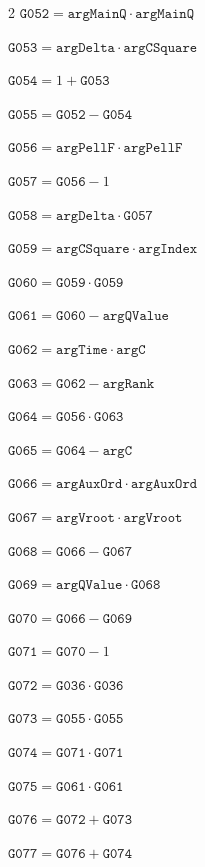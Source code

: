 \documentclass[10pt]{article}
\begin{document}
\begin{multicols}{2}
\noindent $\mathtt{G052}=\mathtt{argMainQ}\cdot \mathtt{argMainQ}$\par
\noindent $\mathtt{G053}=\mathtt{argDelta}\cdot \mathtt{argCSquare}$\par
\noindent $\mathtt{G054}=1+\mathtt{G053}$\par
\noindent $\mathtt{G055}=\mathtt{G052}-\mathtt{G054}$\par
\noindent $\mathtt{G056}=\mathtt{argPellF}\cdot \mathtt{argPellF}$\par
\noindent $\mathtt{G057}=\mathtt{G056}-1$\par
\noindent $\mathtt{G058}=\mathtt{argDelta}\cdot \mathtt{G057}$\par
\noindent $\mathtt{G059}=\mathtt{argCSquare}\cdot \mathtt{argIndex}$\par
\noindent $\mathtt{G060}=\mathtt{G059}\cdot \mathtt{G059}$\par
\noindent $\mathtt{G061}=\mathtt{G060}-\mathtt{argQValue}$\par
\noindent $\mathtt{G062}=\mathtt{argTime}\cdot \mathtt{argC}$\par
\noindent $\mathtt{G063}=\mathtt{G062}-\mathtt{argRank}$\par
\noindent $\mathtt{G064}=\mathtt{G056}\cdot \mathtt{G063}$\par
\noindent $\mathtt{G065}=\mathtt{G064}-\mathtt{argC}$\par
\noindent $\mathtt{G066}=\mathtt{argAuxOrd}\cdot \mathtt{argAuxOrd}$\par
\noindent $\mathtt{G067}=\mathtt{argVroot}\cdot \mathtt{argVroot}$\par
\noindent $\mathtt{G068}=\mathtt{G066}-\mathtt{G067}$\par
\noindent $\mathtt{G069}=\mathtt{argQValue}\cdot \mathtt{G068}$\par
\noindent $\mathtt{G070}=\mathtt{G066}-\mathtt{G069}$\par
\noindent $\mathtt{G071}=\mathtt{G070}-1$\par
\noindent $\mathtt{G072}=\mathtt{G036}\cdot \mathtt{G036}$\par
\noindent $\mathtt{G073}=\mathtt{G055}\cdot \mathtt{G055}$\par
\noindent $\mathtt{G074}=\mathtt{G071}\cdot \mathtt{G071}$\par
\noindent $\mathtt{G075}=\mathtt{G061}\cdot \mathtt{G061}$\par
\noindent $\mathtt{G076}=\mathtt{G072}+\mathtt{G073}$\par
\noindent $\mathtt{G077}=\mathtt{G076}+\mathtt{G074}$\par

\end{multicols}
\end{document}
